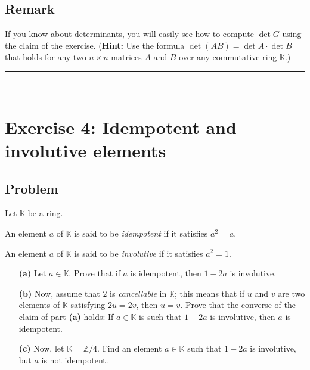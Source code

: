 \documentclass[paper=a4, fontsize=12pt]{scrartcl}%
\theoremstyle{plainsl}
\theoremstyle{definition}
\theoremstyle{remark}
\begin{document}
\subsection{Remark}

If you know about determinants, you will easily see how to compute $\det G$
using the claim of the exercise. (\textbf{Hint:} Use the formula $\det\left(
AB\right)  =\det A\cdot\det B$ that holds for any two $n\times n$-matrices $A$
and $B$ over any commutative ring $\mathbb{K}$.)

\rule{\linewidth}{0.3pt} \\[0.4cm]

\section{Exercise 4: Idempotent and involutive elements}

\subsection{Problem}

Let $\mathbb{K}$ be a ring.

An element $a$ of $\mathbb{K}$ is said to be \textit{idempotent} if it
satisfies $a^{2} = a$.

An element $a$ of $\mathbb{K}$ is said to be \textit{involutive} if it
satisfies $a^{2} = 1$.

\begin{enumerate}
\item[\textbf{(a)}] Let $a \in\mathbb{K}$. Prove that if $a$ is idempotent,
then $1 - 2a$ is involutive.

\item[\textbf{(b)}] Now, assume that $2$ is \textit{cancellable} in
$\mathbb{K}$; this means that if $u$ and $v$ are two elements of $\mathbb{K}$
satisfying $2u=2v$, then $u=v$. Prove that the converse of the claim of part
\textbf{(a)} holds: If $a\in\mathbb{K}$ is such that $1-2a$ is involutive,
then $a$ is idempotent.

\item[\textbf{(c)}] Now, let $\mathbb{K}=\mathbb{Z}/4$. Find an element
$a\in\mathbb{K}$ such that $1-2a$ is involutive, but $a$ is not idempotent.
\end{enumerate}
\end{document}
